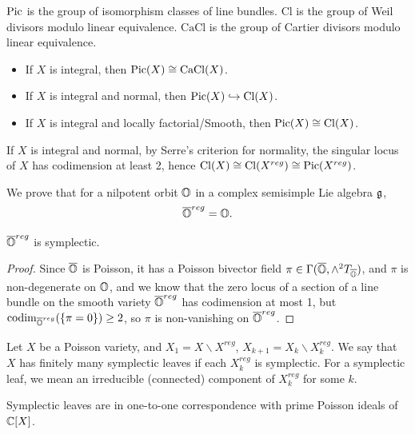 $\operatorname{Pic}$ is the group of isomorphism classes of line bundles. $\mathrm{Cl}$ is the group of Weil divisors modulo linear equivalence. $\mathrm{CaCl}$ is the group of Cartier divisors modulo linear equivalence.

\begin{itemize}
  \item If $X$ is integral, then $\operatorname{Pic}(X) \cong \mathrm{CaCl}(X)$.
  \item If $X$ is integral and normal, then $\operatorname{Pic}(X) \hookrightarrow  \mathrm{Cl}(X)$.
  \item If $X$ is integral and locally factorial/Smooth, then $\operatorname{Pic}(X) \cong \mathrm{Cl}(X)$.
\end{itemize}

If $X$ is integral and normal, by Serre's criterion for normality, the singular locus of $X$ has codimension at least 2, hence $\mathrm{Cl}(X) \cong \mathrm{Cl}(X^{reg}) \cong \operatorname{Pic}(X^{reg})$.


\cite{Losev2022Topics}

We prove that for a nilpotent orbit $\mathbb{O}$ in a complex semisimple Lie algebra $\mathfrak{g}$,
\[
  \overline{\mathbb{O}}^{reg} = \mathbb{O}.
\]

\begin{lem}
  $\overline{\mathbb{O}}^{reg}$ is symplectic.
\end{lem}

\begin{proof}
  Since $\overline{\mathbb{O}}$ is Poisson, it has a Poisson bivector field $\pi \in \Gamma(\overline{\mathbb{O}}, \wedge^2 T_{\overline{\mathbb{O}}})$, and $\pi$ is non-degenerate on $\mathbb{O}$, and we know that the zero locus of a section of a line bundle on the smooth variety $\overline{\mathbb{O}}^{reg}$ has codimension at most 1, but $\operatorname{codim}_{\overline{\mathbb{O}}^{reg}}(\{ \pi = 0 \}) \geq 2$, so $\pi$ is non-vanishing on $\overline{\mathbb{O}}^{reg}$.
\end{proof}

Let $X$ be a Poisson variety, and $X_1 = X \backslash X^{reg}$, $X_{k+1} = X_k \backslash X_k^{reg}$. We say that $X$ has finitely many symplectic leaves if each $X_k^{reg}$ is symplectic. For a symplectic leaf, we mean an irreducible (connected) component of $X_k^{reg}$ for some $k$.

\begin{lem}
  Symplectic leaves are in one-to-one correspondence with prime Poisson ideals of $\mathbb{C}[X]$.
\end{lem}

